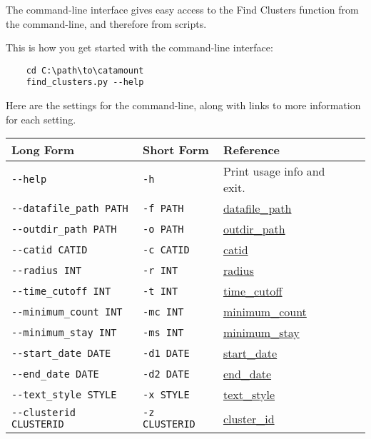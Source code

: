 The command-line interface gives easy access to the Find Clusters function
from the command-line, and therefore from scripts.

This is how you get started with the command-line interface:

\begin{verbatim}
    cd C:\path\to\catamount
    find_clusters.py --help
\end{verbatim}

Here are the settings for the command-line, along with links
to more information for each setting.

\begin{table}[h]
\begin{tabular}{|l|l|l|l|}
  \hline
  Long Form & Short Form & Reference \\ \hline \hline

  \verb=--help= & \verb=-h= & Print usage info and exit. \\ \hline
  \verb=--datafile_path PATH= & \verb=-f PATH= & \hyperlink{global-datafile-path}{datafile\_path} \\ \hline
  \verb=--outdir_path PATH= & \verb=-o PATH= & \hyperlink{global-outdir-path}{outdir\_path} \\ \hline
  \verb=--catid CATID= & \verb=-c CATID= & \hyperlink{cluster-catid}{catid} \\ \hline
  \verb=--radius INT= & \verb=-r INT= & \hyperlink{cluster-radius}{radius} \\ \hline
  \verb=--time_cutoff INT= & \verb=-t INT= & \hyperlink{cluster-time-cutoff}{time\_cutoff} \\ \hline
  \verb=--minimum_count INT= & \verb=-mc INT= & \hyperlink{cluster-minimum-count}{minimum\_count} \\ \hline
  \verb=--minimum_stay INT= & \verb=-ms INT= & \hyperlink{cluster-minimum-stay}{minimum\_stay} \\ \hline
  \verb=--start_date DATE= & \verb=-d1 DATE= & \hyperlink{cluster-start-date}{start\_date} \\ \hline
  \verb=--end_date DATE= & \verb=-d2 DATE= & \hyperlink{cluster-end-date}{end\_date} \\ \hline
  \verb=--text_style STYLE= & \verb=-x STYLE= & \hyperlink{cluster-text-style}{text\_style} \\ \hline
  \verb=--clusterid CLUSTERID= & \verb=-z CLUSTERID= & \hyperlink{cluster-clusterid}{cluster\_id} \\ \hline

\end{tabular}
\end{table}

